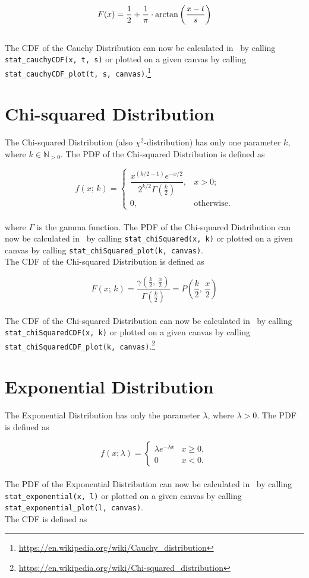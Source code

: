 		$$\displaystyle F(x) = \frac{1}{2} + \frac{1}{\pi} \cdot \arctan\left(\frac{x-t}{s}\right)$$
		\\[0.3cm]
		The \ac{CDF} of the Cauchy Distribution can now be calculated in \setlx\ by calling \lstinline{stat_cauchyCDF(x, t, s)} or plotted on a given canvas by calling \lstinline{stat_cauchyCDF_plot(t, s, canvas)}.\footnote{\url{https://en.wikipedia.org/wiki/Cauchy_distribution}}

	\section{Chi-squared Distribution}

		The Chi-squared Distribution (also $\chi^2$-distribution) has only one parameter $k$, where $k \in \mathbb{N}_{>0}$. The \ac{PDF} of the Chi-squared Distribution is defined as

		$$f(x;\,k) =
		\begin{cases}
			\dfrac{x^{(k/2-1)} e^{-x/2}}{2^{k/2} \Gamma\left(\frac k 2 \right)},  & x > 0; \\ 0, & \text{otherwise}.
		\end{cases}$$
		\\[0.3cm]
		where $\Gamma$ is the gamma function. The \ac{PDF} of the Chi-squared Distribution can now be calculated in \setlx\ by calling \lstinline{stat_chiSquared(x, k)} or plotted on a given canvas by calling \lstinline{stat_chiSquared_plot(k, canvas)}.
		\\[0.3cm]
		The \ac{CDF} of the Chi-squared Distribution is defined as

		$$F(x;\,k) = \frac{\gamma(\frac{k}{2},\,\frac{x}{2})}{\Gamma(\frac{k}{2})} = P\left(\frac{k}{2},\,\frac{x}{2}\right)$$
		\\[0.3cm]
		The \ac{CDF} of the Chi-squared Distribution can now be calculated in \setlx\ by calling \lstinline{stat_chiSquaredCDF(x, k)} or plotted on a given canvas by calling \lstinline{stat_chiSquaredCDF_plot(k, canvas)}.\footnote{\url{https://en.wikipedia.org/wiki/Chi-squared_distribution}}

	\section{Exponential Distribution}

		The Exponential Distribution has only the parameter $\lambda$, where $\lambda > 0$. The \ac{PDF} is defined as

		$$f(x;\lambda) = \begin{cases} \lambda e^{-\lambda x} & x \ge 0, \\ 0 & x < 0. \end{cases}$$
		\\[0.3cm]
		The \ac{PDF} of the Exponential Distribution can now be calculated in \setlx\ by calling \lstinline{stat_exponential(x, l)} or plotted on a given canvas by calling \lstinline{stat_exponential_plot(l, canvas)}.
		\\[0.3cm]
		The \ac{CDF} is defined as

